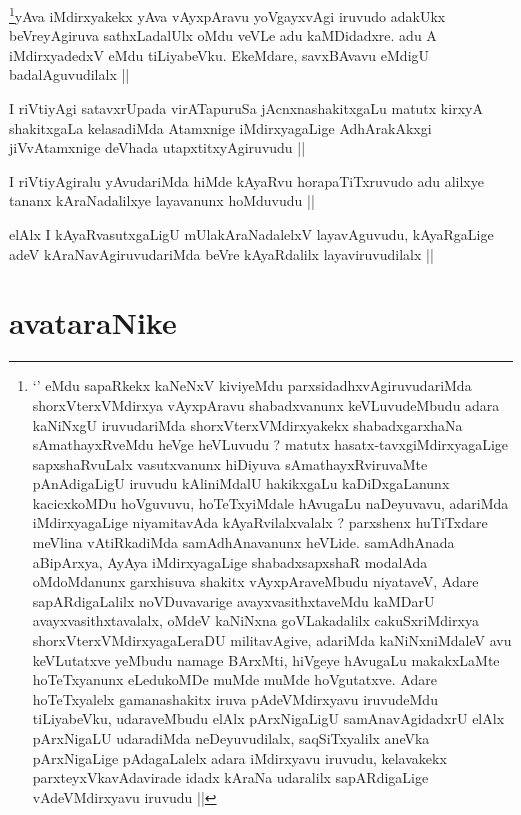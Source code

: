 \begin{artha}
\footnote[1]{`\stext' eMdu sapaRkekx kaNeNxV kiviyeMdu parxsidadhxvAgiruvudariMda shorxVterxVMdirxya vAyxpAravu shabadxvanunx keVLuvudeMbudu adara kaNiNxgU iruvudariMda shorxVterxVMdirxyakekx shabadxgarxhaNa sAmathayxRveMdu heVge heVLuvudu ? matutx hasatx-tavxgiMdirxyagaLige sapxshaRvuLalx vasutxvanunx hiDiyuva sAmathayxRviruvaMte pAnAdigaLigU iruvudu kAliniMdalU hakikxgaLu kaDiDxgaLanunx kacicxkoMDu hoVguvuvu, hoTeTxyiMdale hAvugaLu naDeyuvavu, adariMda iMdirxyagaLige niyamitavAda kAyaRvilalxvalalx ? parxshenx huTiTxdare meVlina vAtiRkadiMda samAdhAnavanunx heVLide. samAdhAnada aBipArxya, AyAya iMdirxyagaLige shabadxsapxshaR modalAda oMdoMdanunx garxhisuva shakitx vAyxpAraveMbudu niyataveV, Adare sapARdigaLalilx noVDuvavarige avayxvasithxtaveMdu kaMDarU avayxvasithxtavalalx, oMdeV kaNiNxna goVLakadalilx cakuSxriMdirxya shorxVterxVMdirxyagaLeraDU militavAgive, adariMda kaNiNxniMdaleV avu keVLutatxve yeMbudu namage BArxMti, hiVgeye hAvugaLu makakxLaMte hoTeTxyanunx eLedukoMDe muMde muMde hoVgutatxve. Adare hoTeTxyalelx gamanashakitx iruva pAdeVMdirxyavu iruvudeMdu tiLiyabeVku, udaraveMbudu elAlx pArxNigaLigU samAnavAgidadxrU elAlx pArxNigaLU udaradiMda neDeyuvudilalx, saqSiTxyalilx aneVka pArxNigaLige pAdagaLalelx adara iMdirxyavu iruvudu, kelavakekx parxteyxVkavAdavirade idadx kAraNa udaralilx sapARdigaLige vAdeVMdirxyavu iruvudu ||}yAva iMdirxyakekx yAva vAyxpAravu yoVgayxvAgi iruvudo adakUkx beVreyAgiruva sathxLadalUlx oMdu veVLe adu kaMDidadxre. adu A iMdirxyadedxV eMdu tiLiyabeVku. EkeMdare, savxBAvavu eMdigU badalAguvudilalx ||
\end{artha}

\begin{artha}
I riVtiyAgi satavxrUpada virATapuruSa jAcnxnashakitxgaLu matutx kirxyA shakitxgaLa kelasadiMda Atamxnige iMdirxyagaLige AdhArakAkxgi jiVvAtamxnige deVhada utapxtitxyAgiruvudu ||
\end{artha}

\begin{artha}
I riVtiyAgiralu yAvudariMda hiMde kAyaRvu horapaTiTxruvudo adu alilxye tananx kAraNadalilxye layavanunx hoMduvudu ||
\end{artha}

\begin{artha}
elAlx I kAyaRvasutxgaLigU mUlakAraNadalelxV layavAguvudu, kAyaRgaLige adeV kAraNavAgiruvudariMda beVre kAyaRdalilx layaviruvudilalx ||
\end{artha}

\section*{avataraNike}

